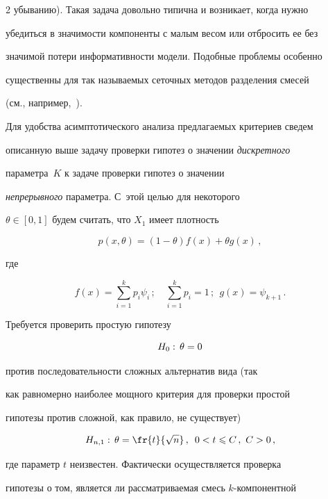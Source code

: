 \begin{multicols}{2}
убыванию). Такая задача довольно типична и возникает, когда нужно

убедиться в значимости компоненты с малым весом или отбросить ее без

значимой потери информативности модели. Подобные проблемы особенно

существенны для так называемых сеточных методов разделения смесей

(см., например,~\cite{Korolev2007, Korolev2010}).



Для удобства асимптотического анализа предлагаемых критериев сведем

описанную выше задачу проверки гипотез о значении \textit{дискретного}

па\-ра\-мет\-ра~$K$ к задаче проверки гипотез о значении

\textit{непрерывного} параметра. С~этой целью для некоторого

$\theta\in[0,1]$ будем считать, что $X_1$ имеет плотность

\begin{equation}

\label{p} p(x,\theta)=(1-\theta) f(x)+\theta  g(x)\,,

\end{equation}

где

$$

f(x)=\sum\limits_{i=1}^{k}p_i\psi_i\,;\quad 

\sum\limits_{i=1}^{k}p_i=1\,;\ \  g(x)=\psi_{k+1}\,.

$$



Требуется проверить простую гипотезу

$$

H_0:\,\theta=0\\

$$

против последовательности сложных альтернатив вида (так

как равномерно наиболее мощного критерия для проверки простой

гипотезы против сложной, как правило, не существует)

$$

H_{n,1}:\,\theta=\fr{t}{\sqrt{n}}\,,\enskip 0<t\leqslant C\,,\  C>0\,,

$$

где параметр $t$ неизвестен. Фактически  осуществляется проверка

гипотезы о том, является ли рас\-смат\-ри\-ва\-емая смесь $k$-ком\-по\-нент\-ной


\end{multicols}
